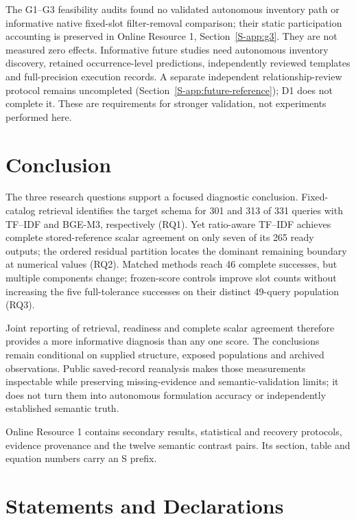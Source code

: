 \documentclass[pdflatex,iicol,sn-basic,Numbered]{sn-jnl}
\begin{document}
The G1--G3 feasibility audits found no validated autonomous inventory path or informative native fixed-slot filter-removal comparison; their static participation accounting is preserved in Online Resource 1, Section~\ref{S-app:g3}. They are not measured zero effects. Informative future studies need autonomous inventory discovery, retained occurrence-level predictions, independently reviewed templates and full-precision execution records. A separate independent relationship-review protocol remains uncompleted (Section~\ref{S-app:future-reference}); D1 does not complete it. These are requirements for stronger validation, not experiments performed here.

\section{Conclusion}
\label{sec:conclusion}
The three research questions support a focused diagnostic conclusion. Fixed-catalog retrieval identifies the target schema for 301 and 313 of 331 queries with TF--IDF and BGE-M3, respectively (RQ1). Yet ratio-aware TF--IDF achieves complete stored-reference scalar agreement on only seven of its 265 ready outputs; the ordered residual partition locates the dominant remaining boundary at numerical values (RQ2). Matched methods reach 46 complete successes, but multiple components change; frozen-score controls improve slot counts without increasing the five full-tolerance successes on their distinct 49-query population (RQ3).

Joint reporting of retrieval, readiness and complete scalar agreement therefore provides a more informative diagnosis than any one score. The conclusions remain conditional on supplied structure, exposed populations and archived observations. Public saved-record reanalysis makes those measurements inspectable while preserving missing-evidence and semantic-validation limits; it does not turn them into autonomous formulation accuracy or independently established semantic truth.
\backmatter

Online Resource 1 contains secondary results, statistical and recovery protocols, evidence provenance and the twelve semantic contrast pairs. Its section, table and equation numbers carry an S prefix.


\section*{Statements and Declarations}
\end{document}
